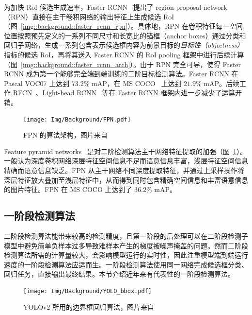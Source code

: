 为加快 RoI 候选生成速率，Faster RCNN~\citep{ren2015faster} 提出了 region proposal network （RPN）直接在主干卷积网络的输出特征上生成候选 RoI （图~\ref{img::background::faster_rcnn_rpn}）。具体地，RPN 在卷积特征每一空间位置按照预先定义的一系列不同尺寸和长宽比的锚框（anchor boxes）通过分类和回归子网络，生成一系列包含表示候选框内容为前景目标的\emph{目标性（objectness）}指标的候选 RoI，再将其送入 Faster RCNN 的 RoI pooling 框架中进行后续计算（图~\ref{img::background::faster_rcnn_arch}）。由于 RPN 完全可导，使得 Faster RCNN 成为第一个能够完全端到端训练的二阶目标检测算法。Faster RCNN 在 Pascal VOC07 上达到 $73.2\%$ mAP，在 MS COCO~\citep{lin2014microsoft} 上达到 $21.9\%$ mAP。后续工作 RFCN~\citep{dai2016r}、Light-head RCNN~\citep{li2017light} 等在 Faster RCNN 框架内进一步减少了运算开销。

\begin{figure}[htb]
  \centering
  \texttt{[image: Img/Background/FPN.pdf]}
  \caption{FPN 的算法架构，图片来自~\citet{lin2017feature}}
  \label{img::background::FPN}
\end{figure}

Feature pyramid networks~\citep{lin2017feature} 是对二阶检测算法主干网络特征提取的加强（图~\ref{img::background::FPN}）。一般认为深度卷积网络深层特征空间信息不足而语意信息丰富，浅层特征空间信息精确而语意信息缺乏。FPN 从主干网络不同深度提取特征，并通过上采样操作将深层特征放大叠加至浅层特征中，从而得到同时包含精确空间信息和丰富语意信息的图片特征。FPN 在 MS COCO 上达到了 $36.2\%$ mAP。
\subsection{一阶段检测算法}
二阶段检测算法能带来较高的检测精度，且第一阶段的后处理可以在二阶段检测子模型中避免简单负样本过多导致难样本产生的梯度被噪声掩盖的问题。然而二阶段检测算法所需的计算量较大，会影响模型运行的实时性，因此注重模型端到端运行速度的一阶段检测算法应运而生。一阶段检测算法使用同一网络完成候选框分类、回归任务，直接输出最终结果。本节介绍近年来有代表性的一阶段检测算法。

\begin{figure}[htb]
  \centering
  \texttt{[image: Img/Background/YOLO\_bbox.pdf]}
  \caption{YOLOv2 所用的边界框回归算法，图片来自~\citet{redmon2017yolo9000}}
  \label{img::background::yolo_bbox}
\end{figure}

